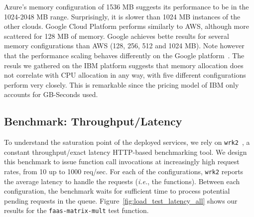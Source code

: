 Azure's memory configuration of 1536 \gls{MB} suggests its performance to be in the 1024-2048 \gls{MB} range.
Surprisingly, it is slower than 1024 \gls{MB} instances of the other clouds.  
Google Cloud Platform performs similarly to \gls{AWS}, although more scattered for 128 \gls{MB} of memory. 
Google achieves bette results for several memory configurations than \gls{AWS} (128, 256, 512 and 1024 \gls{MB}). %
Note however that the performance scaling behaves differently on the Google platform~\cite{GoogleFunctionsPricing}.
The resuls we gathered on the \gls{IBM} platform suggests that memory allocation does not correlate with \gls{CPU} allocation in any way, with five different configurations perform very closely. 
This is remarkable since the pricing model of \gls{IBM} only accounts for GB-Seconds used. 

\subsection{Benchmark: Throughput/Latency}
\label{sec:loadtest}
To understand the saturation point of the deployed services, we rely on \texttt{wrk2}~\cite{wrk2}, a constant throughput/exact latency HTTP-based benchmarking tool.
We design this benchmark to issue function call invocations at increasingly high request rates, from 10 up to 1000 req/sec.
For each of the configurations, \texttt{wrk2} reports the average latency to handle the requests (\emph{i.e.}, the functions).
Between each configuration, the benchmark waits for sufficient time to process potential pending requests in the queue.
Figure~\ref{fig:load_test_latency_all} shows our results for the \texttt{faas-matrix-mult} test function.

